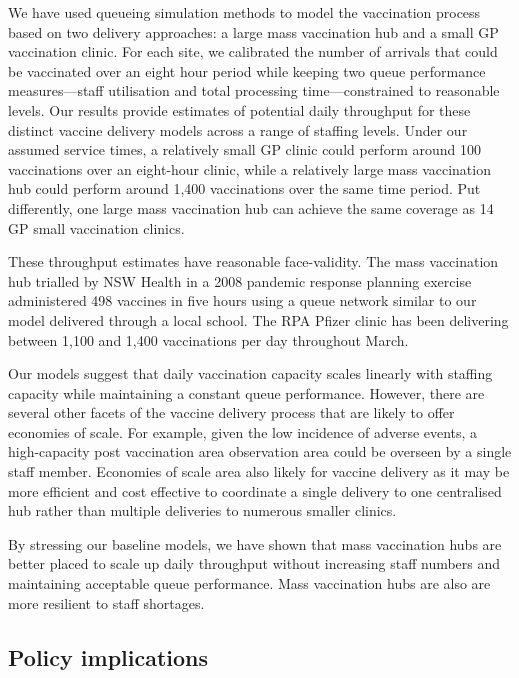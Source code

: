 \documentclass{article}
\begin{document}
We have used queueing simulation methods to model the vaccination
process based on two delivery approaches: a large mass vaccination hub
and a small GP vaccination clinic. For each site, we calibrated the
number of arrivals that could be vaccinated over an eight hour period
while keeping two queue performance measures---staff utilisation and
total processing time---constrained to reasonable levels. Our results
provide estimates of potential daily throughput for these distinct
vaccine delivery models across a range of staffing levels. Under our
assumed service times, a relatively small GP clinic could perform around
100 vaccinations over an eight-hour clinic, while a relatively large
mass vaccination hub could perform around 1,400 vaccinations over the
same time period. Put differently, one large mass vaccination hub can
achieve the same coverage as 14 GP small vaccination clinics.

These throughput estimates have reasonable face-validity. The mass
vaccination hub trialled by NSW Health in a 2008 pandemic response
planning exercise administered 498 vaccines in five hours using a queue
network similar to our model delivered through a local school. The RPA
Pfizer clinic has been delivering between 1,100 and 1,400 vaccinations
per day throughout March.

Our models suggest that daily vaccination capacity scales linearly with
staffing capacity while maintaining a constant queue performance.
However, there are several other facets of the vaccine delivery process
that are likely to offer economies of scale. For example, given the low
incidence of adverse events, a high-capacity post vaccination area
observation area could be overseen by a single staff member. Economies
of scale area also likely for vaccine delivery as it may be more
efficient and cost effective to coordinate a single delivery to one
centralised hub rather than multiple deliveries to numerous smaller
clinics.

By stressing our baseline models, we have shown that mass vaccination
hubs are better placed to scale up daily throughput without increasing
staff numbers and maintaining acceptable queue performance. Mass
vaccination hubs are also are more resilient to staff shortages.

\hypertarget{policy-implications}{%
\subsection{Policy implications}\label{policy-implications}}
\end{document}
